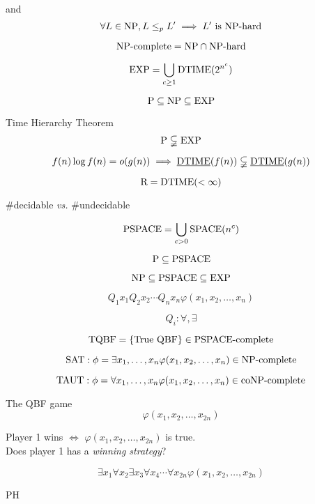 \begin{frame}{\nph{} and \npc}
  \[
	\forall L \in \text{NP}, L \le_{p} L' \implies L' \text{ is } \text{NP-hard}
  \]

  \[
	\text{NP-complete} = \text{NP} \cap \text{NP-hard}
  \]
\end{frame}
\begin{frame}{\expcls}
  \[
	\text{EXP} = \bigcup_{c \ge 1} \text{DTIME}(2^{n^c})
  \]

  \[
    \text{P} \subseteq \text{NP} \subseteq \text{EXP}
  \]
\end{frame}
\begin{frame}{Time Hierarchy Theorem}
  \[
	\text{P} \subsetneqq \text{EXP}
  \]

  \begin{theorem}
	\[
	  f(n) \log f(n) = o(g(n)) \implies \emph{\text{DTIME}}(f(n)) \subsetneqq \emph{\text{DTIME}}(g(n))
	\]
  \end{theorem}
\end{frame}
\begin{frame}{\rcls}
  \[
	\text{R} = \text{DTIME}(<\infty)
  \]

  \vspace{0.80cm}
  \centerline{\#decidable \emph{vs.} \#undecidable}
\end{frame}
\begin{frame}{\pspace}
  \[
	\text{PSPACE} = \bigcup_{c > 0} \text{SPACE}(n^c)
  \]

  \[
	\text{P} \subseteq \text{PSPACE}
  \]
  
  \[
	\text{NP} \subseteq \text{PSPACE} \subseteq \text{EXP}
  \]
\end{frame}
\begin{frame}{\pspacec}
  \begin{definition}
	\[
	  Q_1 x_1 Q_2 x_2 \cdots Q_n x_n \varphi(x_1, x_2, \ldots, x_n)
	\]

	\[
	  Q_i: \forall, \exists
	\]
  \end{definition}

  \[
	\text{TQBF} = \{\text{True QBF}\} \in \text{PSPACE-complete}
  \]

  \[
	\text{SAT}: \phi = \exists x_1,\ldots,x_n \varphi(x_1, x_2, \ldots, x_n) \in \text{NP-complete}
  \]

  \[
	\text{TAUT}: \phi = \forall x_1,\ldots,x_n \varphi(x_1, x_2, \ldots, x_n) \in \text{coNP-complete}
  \]
\end{frame}
\begin{frame}{\pspacec}
  \begin{exampleblock}{The QBF game}
	\[
	  \varphi(x_1,x_2,\dots,x_{2n})
	\]

	\begin{center}
	  Player 1 wins $\iff$ $\varphi(x_1,x_2,\dots,x_{2n})$ is true.\\[6pt]
	  Does player 1 has a \emph{winning strategy}?
	\end{center}

	\[
	  \exists x_1 \forall x_2 \exists x_3 \forall x_4 \cdots \forall x_{2n} \varphi(x_1,x_2,\dots,x_{2n})
	\]
  \end{exampleblock}
\end{frame}
\begin{frame}{PH}

\end{frame}
